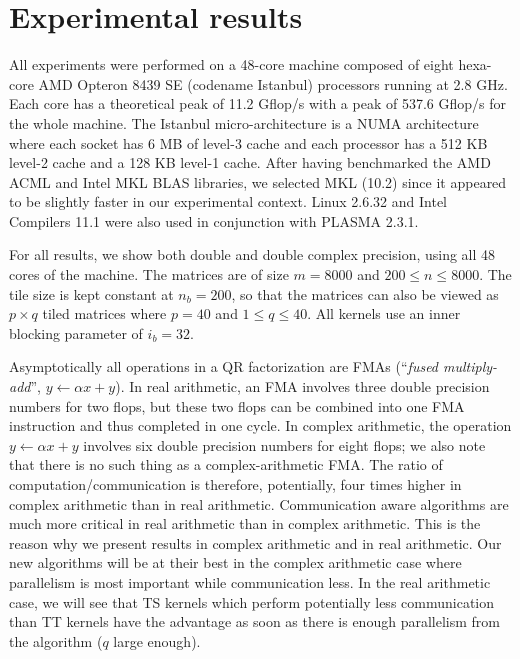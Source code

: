 \documentclass[a4paper,twopages]{article}
\begin{document}
\section{Experimental results}
\label{sec.experiments}

All experiments were performed on a 48-core machine composed of eight
hexa-core AMD Opteron 8439 SE (codename Istanbul) processors running at 2.8
GHz. Each core has a theoretical peak of 11.2 Gflop/s with a peak of 537.6
Gflop/s for the whole machine. The Istanbul micro-architecture is a NUMA
architecture where each socket has 6 MB of level-3 cache and each processor has
a 512 KB level-2 cache and a 128 KB level-1 cache.  After having benchmarked
the AMD ACML and Intel MKL BLAS libraries, we selected MKL (10.2) since it
appeared to be slightly faster in our experimental context.  Linux 2.6.32 and
Intel Compilers 11.1 were also used in conjunction with PLASMA 2.3.1.

For all results, we show both double and double complex precision, using all 48
cores of the machine.  The matrices are of size $m=8000$ and $200 \leq n \leq
8000$.  The tile size is kept constant at $n_b=200$, so that the
matrices can also be viewed as $p \times q$ tiled matrices where $p=40$ and $1
\leq q \leq 40$. All kernels use an inner blocking parameter of $i_b=32$.

Asymptotically all operations in a QR factorization are FMAs (``{\em fused
multiply-add}'', $ y \leftarrow \alpha x + y$).  In real arithmetic, an FMA
involves three double precision numbers for two flops, but these two flops can
be combined into one FMA instruction and thus completed in one cycle.  In
complex arithmetic, the operation $ y \leftarrow \alpha x + y$ involves
six double precision numbers for eight flops; we also note that there is no
such thing as a complex-arithmetic FMA.  The ratio of computation/communication
is therefore, potentially, four times higher in complex arithmetic than
in real arithmetic. Communication aware algorithms are much more critical in
real arithmetic than in complex arithmetic. This is the reason why we present
results in complex arithmetic and in real arithmetic. Our new algorithms will
be at their best in the complex arithmetic case where parallelism is most
important while communication less. In the real arithmetic case, we will see
that TS kernels which perform potentially less communication than TT kernels
have the advantage as soon as there is enough parallelism from the algorithm
($q$ large enough).
\end{document}
